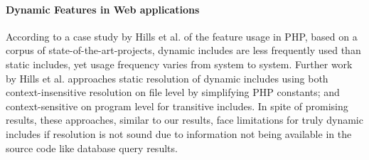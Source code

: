   


\paragraph{Dynamic Features in Web applications}
According to a case study by Hills et al. \cite{Hills:2013:ESP:2483760.2483786}
of the feature usage in PHP, based on a corpus of state-of-the-art-projects,
dynamic includes are less frequently used than static includes, yet usage
frequency varies from system to system. Further work by Hills et al.
\cite{hills2014static,hills2014php} approaches static resolution of dynamic includes using
both context-insensitive resolution on file level by simplifying PHP constants;
and context-sensitive on program level for transitive includes. In spite of 
promising results, these approaches, similar to our results, face limitations
for truly dynamic includes if resolution is not sound due to information not
being available in the source code like database query results.
